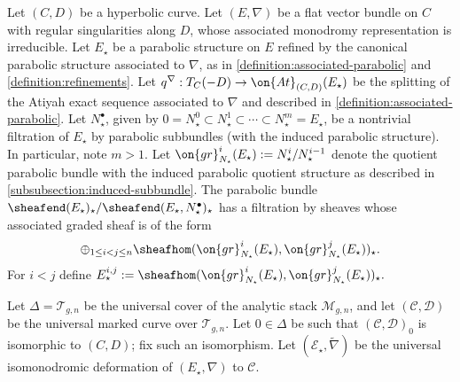 \begin{notation}
\notready
	\label{notation:graded-E}
	Let $(C, D)$ be a hyperbolic curve.
Let $(E, \nabla)$ be a flat vector bundle on $C$ with regular singularities along $D$, whose
associated monodromy representation is irreducible.
Let $E_\star$ be a parabolic structure on $E$ refined by the canonical parabolic structure associated to $\nabla$, as in \autoref{definition:associated-parabolic} and
\autoref{definition:refinements}. Let $q^\nabla: T_C(-D) \to \on{At}_{(C,D)}(E_\star)$ be the splitting of the Atiyah exact sequence associated to $\nabla$ and described in \autoref{definition:associated-parabolic}.
Let
$N^\bullet_\star$, given by $0 = N^0_\star \subset N^1_\star \subset \cdots
\subset N^m_\star = E_\star$, be a
nontrivial filtration of $E_\star$ by parabolic subbundles (with the induced parabolic structure). In particular, note $m > 1$.
Let $\on{gr}^i_{N_\star}(E_\star) := N_\star^i/N_\star^{i-1}$ denote the
quotient parabolic bundle with the induced parabolic quotient structure as described in
\autoref{subsubsection:induced-subbundle}.
The parabolic bundle $\sheafend(E_\star)_\star /\sheafend(E_\star, N^\bullet_\star)_\star$ has a filtration
	by sheaves whose
associated graded sheaf is of the form
\begin{align*}
	\oplus_{1 \leq i< j \leq n} \sheafhom(\on{gr}^i_{N_\star}(E_\star),
	\on{gr}^{j}_{N_\star}(E_\star))_\star.
\end{align*}
For $i<j$ define $E_\star^{i,j} :=
\sheafhom(\on{gr}^i_{N_\star}(E_\star),\on{gr}^{j}_{N_\star}(E_\star))_\star.$

Let $\Delta=\mathscr{T}_{g,n}$ be the universal cover of the analytic stack
$\mathscr{M}_{g,n}$, and let $(\mathscr{C}, \mathscr{D})$ be the universal
marked curve over $\mathscr{T}_{g,n}$. Let $0\in \Delta$ be such that
$(\mathscr{C}, \mathscr{D})_0$ is isomorphic to $(C,D)$; fix such an
isomorphism. Let $(\mathscr{E_\star}, \widetilde{\nabla})$ be the universal
isomonodromic deformation of $(E_\star, \nabla)$ to $\mathscr{C}$.
\end{notation}

